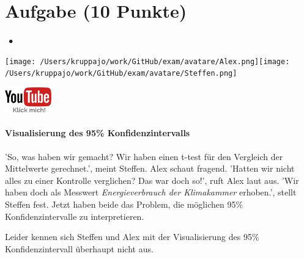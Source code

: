 \documentclass[a4paper, 9pt]{scrartcl}\usepackage[]{graphicx}\usepackage[]{xcolor}
\begin{document}
\section{Aufgabe \hfill (10 Punkte)}


 
\ifcollection
\begin{flushright}
\tiny
\textbf{\examinhaltstart}
\exammodulestatversuch $\;\bullet$
\exammodulebiostat
\vspace{-4Ex}
\end{flushright}
\begin{minipage}[t]{0.5\textwidth}
\texttt{[image: /Users/kruppajo/work/GitHub/exam/avatare/Alex.png]}\hspace{-4mm}\texttt{[image: /Users/kruppajo/work/GitHub/exam/avatare/Steffen.png]}
\end{minipage}
\begin{minipage}[t]{0.5\textwidth}
\hfill
\href{https://youtu.be/6w_KH7t6bp0}{\includegraphics[width = 2cm]{img/youtube}}
\end{minipage}
\fi



\ifcollection
\paragraph{Visualisierung des 95\% Konfidenzintervalls}
\fi

'So, was haben wir gemacht? Wir haben einen t-test für den Vergleich der Mittelwerte gerechnet.', meint Steffen. Alex schaut fragend. 'Hatten wir nicht alles zu einer Kontrolle verglichen? Das war doch so!', ruft Alex laut aus. 'Wir haben doch als Messwert \textit{Energieverbrauch der Klimakammer} erhoben.', stellt Steffen fest. Jetzt haben beide das Problem, die möglichen 95\% Konfidenzintervalle zu interpretieren.

\vspace{1ex}

Leider kennen sich Steffen und Alex mit der Visualisierung des 95\% Konfidenzintervall überhaupt nicht aus. 
\end{document}
